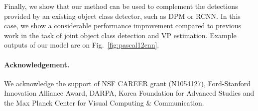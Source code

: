 \documentclass[extendedabs]{bmvc2k}
\begin{document}
Finally, we show that our method can be used to complement the
detections provided by an existing object class detector, such
as DPM or RCNN. In this case, we show a considerable performance improvement
compared to previous work in the task of joint object class detection and VP
estimation. Example outputs of our model are on Fig.~\ref{fig:pascal12cnn}.

\vspace{-0.1in}
\paragraph{Acknowledgement.} We acknowledge the support of NSF CAREER grant
(N1054127), Ford-Stanford Innovation Alliance Award, DARPA, Korea Foundation
for Advanced Studies and the Max Planck Center for Visual Computing \&
Communication.


\end{document}
